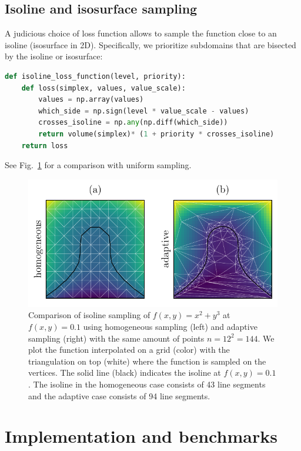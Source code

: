\subsection{Isoline and isosurface sampling}

A judicious choice of loss function allows to sample the function close to an isoline (isosurface in 2D). Specifically, we prioritize subdomains that are bisected by the isoline or isosurface:

\begin{lstlisting}[language=Python]
def isoline_loss_function(level, priority):
    def loss(simplex, values, value_scale):
        values = np.array(values)
        which_side = np.sign(level * value_scale - values)
        crosses_isoline = np.any(np.diff(which_side))
        return volume(simplex)* (1 + priority * crosses_isoline)
    return loss
\end{lstlisting}

See Fig.~\ref{fig:isoline} for a comparison with uniform sampling.

\begin{figure}
\centering
\includegraphics{chapter_adaptive/figures/isoline.pdf}
\caption{Comparison of isoline sampling of $f(x,y)=x^2 + y^3$ at $f(x,y)=0.1$ using homogeneous sampling (left) and adaptive sampling (right) with the same amount of points $n=12^2=144$.
We plot the function interpolated on a grid (color) with the triangulation on top (white) where the function is sampled on the vertices.
The solid line (black) indicates the isoline at $f(x,y)=0.1$.
The isoline in the homogeneous case consists of 43 line segments and the adaptive case consists of 94 line segments.\label{fig:isoline}}
\end{figure}

\section{Implementation and benchmarks}

